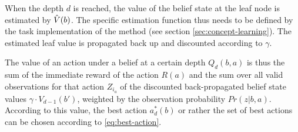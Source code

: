 When the depth $d$ is reached, the value of the belief state at the leaf node is estimated by $\Hat{V}(b)$.
The specific estimation function thus needs to be defined by the task implementation of the method (see section \ref{sec:concept-learning}).
The estimated leaf value is propagated back up and discounted according to $\gamma$. 

The value of an action under a belief at a certain depth $Q_d(b,a)$ is thus the sum of the immediate reward of the action $R(a)$ and the sum over all valid observations for that action $Z_{i_a}$ of the discounted back-propagated belief state values $\gamma \cdot V_{d-1}(b')$, weighted by the observation probability $Pr(z|b,a)$.
According to this value, the best action $a^*_d(b)$ or rather the set of best actions can be chosen according to \autoref{eq:best-action}.



